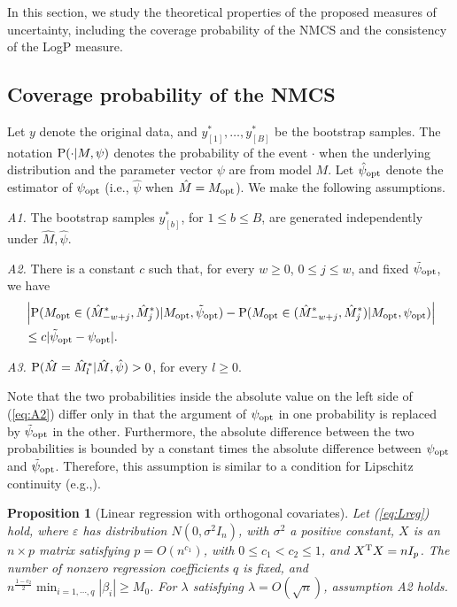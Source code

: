 \documentclass[12pt]{article} %
\newtheorem{proposition}{Proposition}
\theoremstyle{definition}
\begin{document}
In this section, we study the theoretical properties of the proposed measures of uncertainty, including the coverage probability of the NMCS and the consistency of the LogP measure.
 \subsection{Coverage probability of the NMCS}

Let $y$ denote the original data, and $y_{[1]}^{*},\dots,y_{[B]}^{*}$ be the bootstrap samples.
The notation ${\rm P}(\cdot|M,\psi)$ denotes the probability of the event $\cdot$ when the
underlying distribution and the parameter vector $\psi$ are from model $M$. Let
$\hat{\psi}_{\rm opt}$ denote the estimator of $\psi_{\rm opt}$ (i.e., $\hat{\psi}$ when
$\hat{M}=M_{\rm opt}$). We make the following assumptions.

{\it A1.} The bootstrap samples $y_{[b]}^{*}$, for $1\leq b\leq B$, are generated independently
under $\hat{M}, \hat{\psi}$.
 
{\it A2.} There is a constant $c$ such that, for every $w\geq 0$, $0 \leq j \leq w$, and fixed $\tilde{\psi}_{\rm opt}$, we have
 \begin{align}\label{eq:A2}
&\left|{\rm P}(M_{\rm opt}\in(\hat{M}_{-w+j}^{*},\hat{M}_{j}^{*})|M_{\rm opt},\tilde{\psi}_{\rm
 opt})-{\rm P}(M_{\rm opt}\in(\hat{M}_{-w+j}^{*},\hat{M}_{j}^{*})|M_{\rm opt},\psi_{\rm
opt})\right| \nonumber\\
&\leq c|\tilde{\psi}_{\rm opt}-\psi_{\rm opt}|.
\end{align}
 
 {\it A3.} ${\rm P}(\hat{M}=\hat{M}_{l}^{*}|\hat{M},\hat{\psi})>0$, for every $l\geq 0$.
 
 Note that the two probabilities inside the absolute value on the left side of (\ref{eq:A2}) differ only in that the argument of $\psi_{\rm opt}$ in one probability is replaced by $\tilde{\psi}_{\rm opt}$ in the other. Furthermore, the absolute difference between the two probabilities is bounded by a constant times the absolute difference between $\psi_{\rm opt}$ and $\tilde{\psi}_{\rm opt}$. Therefore, this assumption is similar to a condition for Lipschitz continuity (e.g.,\citet[p. 316]{Thomson2008}).

\begin{proposition}[Linear regression with orthogonal covariates]
\label{th:a2}
Let (\ref{eq:Lreg}) hold, where $\varepsilon$ has distribution $N(0,\sigma^{2}I_n)$, with $\sigma^{2}$ a positive constant, $X$ is an $n\times p$ matrix satisfying $p=O(n^{c_1})$, with $0\leq c_1<c_2\leq1$, and $X^{\rm T} X= n I_{p}$. The number of nonzero regression coefficients $q$ is fixed, and $n^{\frac{1-c_2}{2}}\min_{i=1,\cdots, q}|\beta_{i}| \geq M_0$. For $\lambda$ satisfying $\lambda=O(\sqrt{n})$, assumption {\it A2} holds.
\end{proposition} 
\end{document}
